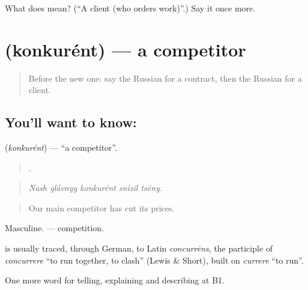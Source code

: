 \begin{tcolorbox}[breakable,colback=teal!4,colframe=teal!35!black,title={Before you move on}]
What does  mean? (\textquotedblleft{}A client (who orders work)\textquotedblright{}.) Say it once more.
\end{tcolorbox}
\section[\texorpdfstring{\ru{конкурент} (konkurént)}{конкурент (konkurént)}]{ (konkurént) — a competitor}

\label{lesson:RU-C363-konkurent}



\begin{quote}
Before the new one: say the Russian for a contract, then the Russian for a client.
\end{quote}

\subsection*{You'll want to know: }
\textbf{} (\emph{konkurént}) — \textquotedblleft{}a competitor\textquotedblright{}.

\begin{quote}
    .
\end{quote}

\begin{quote}
\emph{Nash glávnyy konkurént snízil tsény.}
\end{quote}

\begin{quote}
Our main competitor has cut its prices.
\end{quote}

Masculine. \emph{} — competition.

\begin{cousinweb}
\textbf{} is usually traced, through German, to Latin \emph{concurrēns}, the participle of \emph{concurrere} \textquotedblleft{}to run together, to clash\textquotedblright{} (Lewis \& Short), built on \emph{currere} \textquotedblleft{}to run\textquotedblright{}.
\end{cousinweb}

\begin{grammarlens}[title={What you've built}]
One more word for telling, explaining and describing at B1.
\end{grammarlens}


